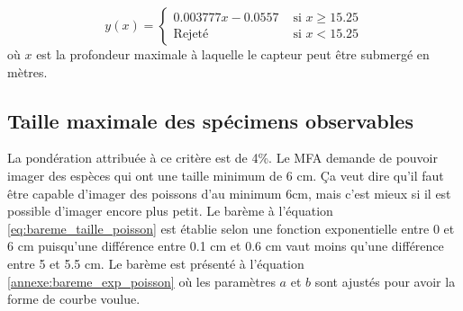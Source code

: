 \begin{equation}
y(x) = \begin{cases}
        0.003777x-0.0557 & \text{ si } x \geq 15.25\\
        \text{Rejeté} & \text{ si } x < 15.25
    \end{cases}
    \label{eq:bareme_profondeur}
\end{equation}
où $x$ est la profondeur maximale à laquelle le capteur peut être submergé en mètres.



\subsection{Taille maximale des spécimens observables}
\label{tmdso}

La pondération attribuée à ce critère est de 4\%. Le MFA demande de pouvoir imager des espèces qui ont une taille minimum de 6 cm. Ça veut dire qu'il faut être capable d'imager des poissons d'au minimum 6cm, mais c'est mieux si il est possible d'imager encore plus petit. Le barème à l'équation \ref{eq:bareme_taille_poisson} est établie selon une fonction exponentielle entre 0 et 6 cm puisqu'une différence entre 0.1 cm et 0.6 cm vaut moins qu'une différence entre 5 et 5.5 cm. Le barème est présenté à l'équation \ref{annexe:bareme_exp_poisson} où les paramètres $a$ et $b$ sont ajustés pour avoir la forme de courbe voulue.

